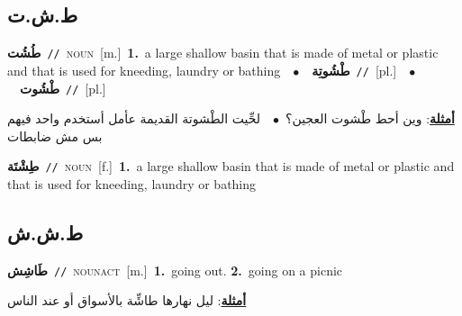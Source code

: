 \documentclass[10pt,a4paper,twoside]{article} %
\begin{document}
\begin{multicols}{2}
\vspace{-3mm}
\subsection*{\color{blue}\foreignlanguage{arabic}{ط.ش.ت}\color{blue}{}} 

{\setlength\topsep{0pt}\textbf{\foreignlanguage{arabic}{طُشُت}}\ {\color{gray}\texttt{//}\color{black}}\ \textsc{noun}\ [m.]\ \textbf{1.}~a large shallow  basin that is made of metal or plastic and that is used for kneeding, laundry or bathing\ \ $\bullet$\ \ \setlength\topsep{0pt}\textbf{\foreignlanguage{arabic}{طْشُوتِة}}\ {\color{gray}\texttt{//}\color{black}}\ [pl.]\ \ $\bullet$\ \ \setlength\topsep{0pt}\textbf{\foreignlanguage{arabic}{طْشُوت}}\ {\color{gray}\texttt{//}\color{black}}\ [pl.]\  \begin{flushright}\color{gray}\foreignlanguage{arabic}{\textbf{\underline{\foreignlanguage{arabic}{أمثلة}}}: وين أحط طْشوت العجين؟\ $\bullet$\ \  لحِّيت الطْشوتة القديمة عأمل أستخدم واحد فيهم بس مش ضابطات}\end{flushright}\color{black}} \vspace{2mm}

{\setlength\topsep{0pt}\textbf{\foreignlanguage{arabic}{طِشْتَة}}\ {\color{gray}\texttt{//}\color{black}}\ \textsc{noun}\ [f.]\ \textbf{1.}~a large shallow  basin that is made of metal or plastic and that is used for kneeding, laundry or bathing\ } \vspace{2mm}

\vspace{-3mm}
\subsection*{\color{blue}\foreignlanguage{arabic}{ط.ش.ش}\color{blue}{}} 

{\setlength\topsep{0pt}\textbf{\foreignlanguage{arabic}{طَاشِش}}\ {\color{gray}\texttt{//}\color{black}}\ \textsc{noun\textunderscore act}\ [m.]\ \textbf{1.}~going out.  \textbf{2.}~going on a picnic\  \begin{flushright}\color{gray}\foreignlanguage{arabic}{\textbf{\underline{\foreignlanguage{arabic}{أمثلة}}}: ليل نهارها طاشِّة بالأسواق أو عند الناس}\end{flushright}\color{black}} \vspace{2mm}


\end{multicols}
\end{document}
